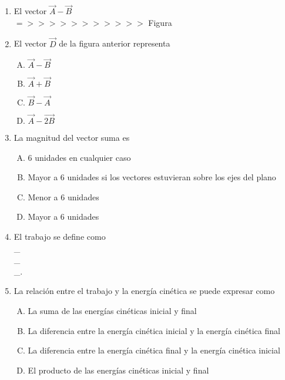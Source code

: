 \begin{enumerate}
\item El vector $\vec{A}-\vec{B}$ \label{yolf-10}\\

$=>>>>>>>>>>>$ Figura


\item El vector $\vec{D}$ de la figura anterior representa \label{yolf-11}\\

\begin{enumerate}[(A)]
\item  $\vec{A}-\vec{B}$
\item  $\vec{A}+\vec{B}$
\item  $\vec{B}-\vec{A}$
\item  $\vec{A}-\vec{2B}$
\end{enumerate}

\item La magnitud del vector suma es  \label{yolf-12}\\

\begin{enumerate}[(A)]
\item  6 unidades en cualquier caso
\item  Mayor a 6 unidades si los vectores estuvieran sobre los ejes del plano
\item  Menor a 6 unidades
\item  Mayor a 6 unidades
\end{enumerate}

\item El trabajo se define como \label{yolf-13}\hrulefill\\
\_\hrulefill\\
\_\hrulefill\\
\_\hrulefill.


\item La relación entre el trabajo y la energía cinética se puede expresar como \label{yolf-14}\\

\begin{enumerate}[(A)]
\item  La suma de las energías cinéticas inicial y final
\item  La diferencia entre la energía cinética inicial y la energía cinética final
\item  La diferencia entre la energía cinética final y la energía cinética inicial
\item  El producto de las energías cinéticas inicial y final
\end{enumerate}


\end{enumerate}
